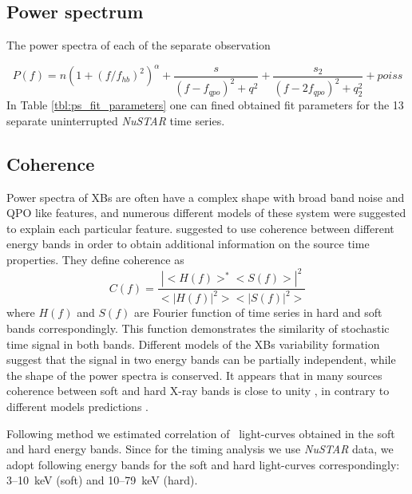 \subsection{Power spectrum}

    The power spectra of each of the separate observation 

$$P(f) = n (1 + (f/f_{hb})^2)^{\alpha} + \frac{s}{(f - f_{qpo})^2 + q^2} +  \frac{s_2}{(f - 2f_{qpo})^2 + q_2^2} + poiss$$
In Table \ref{tbl:ps_fit_parameters} one can fined obtained fit parameters for the 13 separate uninterrupted {\it NuSTAR} time series.

\subsection{Coherence}

    Power spectra of XBs are often have a complex shape with broad band noise and QPO like features, and numerous different models of these system were suggested to explain each particular feature. 
\citep{vaughan97} suggested to use coherence between different energy bands in order to obtain additional information on the source time properties. 
They define coherence as 
\begin{equation}
    C(f) = \frac{|<H(f)>^*<S(f)>|^2}{<|H(f)|^2><|S(f)|^2>}
    \label{eq:nowak_coh}
\end{equation}
where $H(f)$ and $S(f)$ are Fourier function of time series in hard and soft bands correspondingly. 
This function demonstrates the similarity of stochastic time signal in both bands. 
Different models of the XBs variability formation suggest that the signal in two energy bands can be partially independent, while the shape of the power spectra is conserved.
It appears that in many sources coherence between soft and hard X-ray bands is close to unity \citep{nowak99, wijnands01, eijden17}, in contrary to different models predictions \citep[see, discussion in][]{vaughan97}.

Following method \citep{nowak99} we estimated correlation of \grs\ light-curves obtained in the soft and hard energy bands. 
Since for the timing analysis we use {\it NuSTAR} data, we adopt following energy bands for the soft and hard light-curves correspondingly: 3--10~keV (soft) and 10--79~keV (hard).

